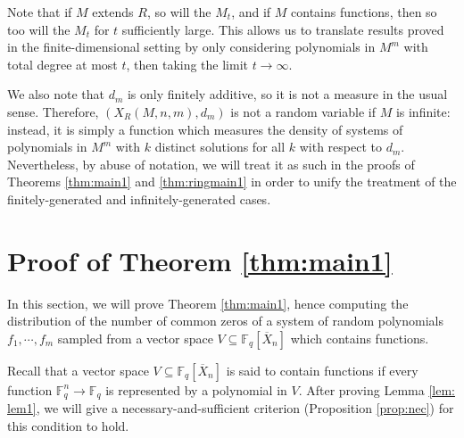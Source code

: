 \documentclass[12pt]{amsart}
\theoremstyle{definition}
\newcommand{\FF}{\mathbb{F} }
\begin{document}
Note that if $M$ extends $R$, so will the $M_t$, and if $M$ contains functions, then so too will the $M_t$ for $t$ sufficiently large. This allows us to translate results proved in the finite-dimensional setting by only considering polynomials in $M^m$ with total degree at most $t$, then taking the limit $t \to \infty$.

We also note that $d_m$ is only finitely additive, so it is not a measure in the usual sense. Therefore, $(X_R(M,n,m), d_m)$ is not a random variable if $M$ is infinite: instead, it is simply a function which measures the density of systems of polynomials in $M^m$ with $k$ distinct solutions for all $k$ with respect to $d_m$. Nevertheless, by abuse of notation, we will treat it as such in the proofs of Theorems \ref{thm:main1} and \ref{thm:ringmain1} in order to unify the treatment of the finitely-generated and infinitely-generated cases.

 



\section{Proof of Theorem \ref{thm:main1}}\label{sec:finitefieldsec}
In this section, we will prove Theorem \ref{thm:main1}, hence computing the distribution of the number of common zeros of a system of random polynomials $f_1, \cdots , f_m$ sampled from a vector space $V \subseteq \FF_q[\overline{X}_n]$ which contains functions. 


Recall that a vector space $V \subseteq \FF_q[\overline{X}_n]$ is said to contain functions if every function $\FF_q^n \to \FF_q$ is represented by a polynomial in $V$. After proving Lemma \ref{lem: lem1}, we will give a necessary-and-sufficient criterion (Proposition \ref{prop:nec}) for this condition to hold.
\end{document}
